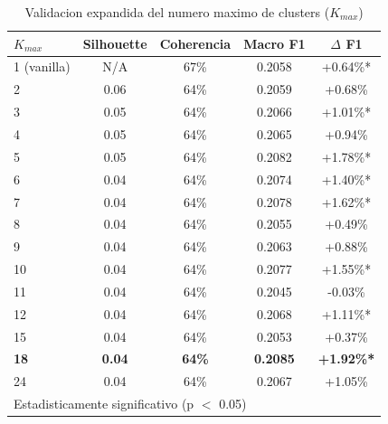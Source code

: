 
\begin{table}[h]
\centering
\caption{Validacion expandida del numero maximo de clusters ($K_{max}$)}
\label{tab:clustering_validation_expanded}
\begin{tabular}{lcccc}
\hline
$K_{max}$ & Silhouette & Coherencia & Macro F1 & $\Delta$ F1 \\
\hline
1 (vanilla) & N/A & 67\% & 0.2058 & +0.64\%* \\
2 & 0.06 & 64\% & 0.2059 & +0.68\% \\
3 & 0.05 & 64\% & 0.2066 & +1.01\%* \\
4 & 0.05 & 64\% & 0.2065 & +0.94\% \\
5 & 0.05 & 64\% & 0.2082 & +1.78\%* \\
6 & 0.04 & 64\% & 0.2074 & +1.40\%* \\
7 & 0.04 & 64\% & 0.2078 & +1.62\%* \\
8 & 0.04 & 64\% & 0.2055 & +0.49\% \\
9 & 0.04 & 64\% & 0.2063 & +0.88\% \\
10 & 0.04 & 64\% & 0.2077 & +1.55\%* \\
11 & 0.04 & 64\% & 0.2045 & -0.03\% \\
12 & 0.04 & 64\% & 0.2068 & +1.11\%* \\
15 & 0.04 & 64\% & 0.2053 & +0.37\% \\
\textbf{18} & \textbf{0.04} & \textbf{64\%} & \textbf{0.2085} & \textbf{+1.92\%*} \\
24 & 0.04 & 64\% & 0.2067 & +1.05\% \\

\hline
\multicolumn{5}{l}{\footnotesize *Estadisticamente significativo (p $<$ 0.05)} \\
\end{tabular}
\end{table}
